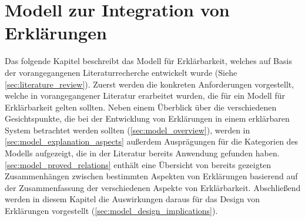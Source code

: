 \chapter{Modell zur Integration von Erklärungen}

Das folgende Kapitel beschreibt das Modell für Erklärbarkeit, welches auf Basis der vorangegangenen Literaturrecherche entwickelt wurde (Siehe \autoref{sec:literature_review}). Zuerst werden die konkreten Anforderungen vorgestellt, welche in vorangegangener Literatur erarbeitet wurden, die für ein Modell für Erklärbarkeit gelten sollten. Neben einem Überblick über die verschiedenen Gesichtspunkte, die bei der Entwicklung von Erklärungen in einem erklärbaren System betrachtet werden sollten (\autoref{sec:model_overview}), werden in \autoref{sec:model_explanation_aspects} außerdem Ausprägungen für die Kategorien des Modells aufgezeigt, die in der Literatur bereits Anwendung gefunden haben. \autoref{sec:model_proved_relations} enthält eine Übersicht von bereits gezeigten Zusammenhängen zwischen bestimmten Aspekten von Erklärungen basierend auf der Zusammenfassung der verschiedenen Aspekte von Erklärbarkeit. Abschließend werden in diesem Kapitel die Auswirkungen daraus für das Design von Erklärungen vorgestellt (\autoref{sec:model_design_implications}).









